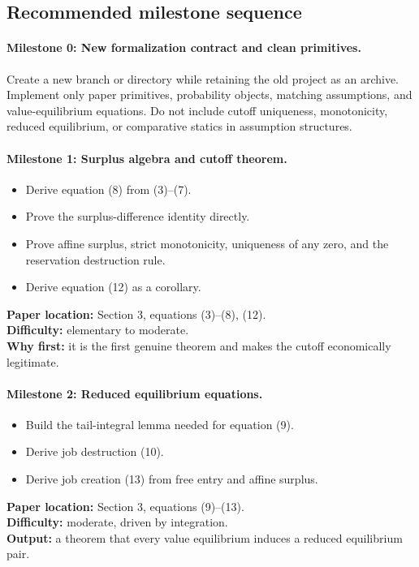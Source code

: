 \documentclass[11pt]{article}
\begin{document}
\subsection{Recommended milestone sequence}

\paragraph{Milestone 0: New formalization contract and clean primitives.}
Create a new branch or directory while retaining the old project as an archive. Implement only paper primitives, probability objects, matching assumptions, and value-equilibrium equations. Do not include cutoff uniqueness, monotonicity, reduced equilibrium, or comparative statics in assumption structures.

\paragraph{Milestone 1: Surplus algebra and cutoff theorem.}
\begin{itemize}
\item Derive equation (8) from (3)--(7).
\item Prove the surplus-difference identity directly.
\item Prove affine surplus, strict monotonicity, uniqueness of any zero, and the reservation destruction rule.
\item Derive equation (12) as a corollary.
\end{itemize}
\textbf{Paper location:} Section 3, equations (3)--(8), (12). \\
\textbf{Difficulty:} elementary to moderate. \\
\textbf{Why first:} it is the first genuine theorem and makes the cutoff economically legitimate.

\paragraph{Milestone 2: Reduced equilibrium equations.}
\begin{itemize}
\item Build the tail-integral lemma needed for equation (9).
\item Derive job destruction (10).
\item Derive job creation (13) from free entry and affine surplus.
\end{itemize}
\textbf{Paper location:} Section 3, equations (9)--(13). \\
\textbf{Difficulty:} moderate, driven by integration. \\
\textbf{Output:} a theorem that every value equilibrium induces a reduced equilibrium pair.
\end{document}
